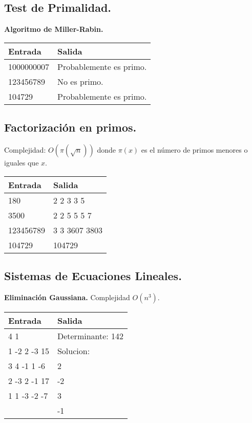 \documentclass[10pt, letterpaper, twoside]{article}
\begin{document}


\subsection{Test de Primalidad.}

\textbf{Algoritmo de Miller-Rabin.}

 

\begin{tabular}{|p{7cm}|p{7cm}|}
\hline
\textbf{Entrada} & \textbf{Salida}\\ \hline
1000000007 & Probablemente es primo.\\
123456789  & No es primo.\\
104729     & Probablemente es primo.\\ \hline
\end{tabular}\bigskip

\subsection{Factorización en primos.}

Complejidad: $O\left(\pi\left(\sqrt{n}\right)\right)$ donde $\pi(x)$ es el número de primos menores o iguales que $x$.



\begin{tabular}{|p{7cm}|p{7cm}|}
\hline
\textbf{Entrada} & \textbf{Salida}\\ \hline
180       & 2 2 3 3 5\\
3500      & 2 2 5 5 5 7\\ 
123456789 & 3 3 3607 3803\\
104729    & 104729\\ \hline
\end{tabular}\bigskip

\subsection{Sistemas de Ecuaciones Lineales.}

\textbf{Eliminación Gaussiana.} Complejidad $O(n^3)$.



\begin{tabular}{|p{7cm}|p{7cm}|}
\hline
\textbf{Entrada} & \textbf{Salida}\\ \hline
4 1          & Determinante: 142\\
1 -2 2 -3 15 & Solucion:\\ 
3 4 -1 1 -6  & 2\\ 
2 -3 2 -1 17 & -2\\ 
1 1 -3 -2 -7 & 3\\ 
             & -1\\ \hline
\end{tabular}\bigskip
\end{document}
